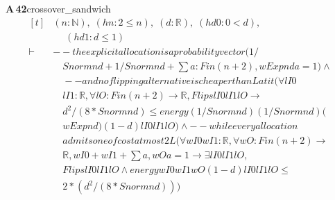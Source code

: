 \documentclass[conference]{IEEEtran}
\theoremstyle{definition}
\newcommand{\lean}[1]{\textsf{\footnotesize #1}}
\begin{document}
\noindent\textbf{A\,42}\quad\lean{crossover\_sandwich}
{\footnotesize\[ \begin{aligned}[t]
&(\mathit{n} : \mathbb{N} ),\; (\mathit{hn} : 2 \leq \mathit{n}),\; (\mathit{d} : \mathbb{R} ),\; (\mathit{hd0} : 0 < \mathit{d}),\\
&\quad \; (\mathit{hd1} : \mathit{d} \leq 1)\\
\vdash\;&-- \mathit{the} \mathit{explicit} \mathit{allocation} \mathit{is} \mathit{a} \mathit{probability} \mathit{vector} (1/\\
&\quad \mathit{Snorm} \mathit{n} \mathit{d} + 1/\mathit{Snorm} \mathit{n} \mathit{d} + \textstyle\sum \mathit{a} : \mathit{Fin} (\mathit{n}+2), \mathit{wExp} \mathit{n} \mathit{d} \mathit{a} = 1) \wedge\\
&\quad -- \mathit{and} \mathit{no} \mathit{flipping} \mathit{alternative} \mathit{is} \mathit{cheaper} \mathit{than} \mathit{L} \mathit{at} \mathit{it} (\forall \mathit{lI0}\\
&\quad \mathit{lI1} : \mathbb{R} , \forall \mathit{lO} : \mathit{Fin} (\mathit{n}+2) \to \mathbb{R} , \mathit{Flips} \mathit{lI0} \mathit{lI1} \mathit{lO} \to\\
&\quad \mathit{d}^{2}/(8*\mathit{Snorm} \mathit{n} \mathit{d}) \leq \mathit{energy} (1/\mathit{Snorm} \mathit{n} \mathit{d}) (1/\mathit{Snorm} \mathit{n} \mathit{d}) (\\
&\quad \mathit{wExp} \mathit{n} \mathit{d}) (1-\mathit{d}) \mathit{lI0} \mathit{lI1} \mathit{lO}) \wedge -- \mathit{while} \mathit{every} \mathit{allocation}\\
&\quad \mathit{admits} \mathit{one} \mathit{of} \mathit{cost} \mathit{at} \mathit{most} 2 \mathit{L} (\forall \mathit{wI0} \mathit{wI1} : \mathbb{R} , \forall \mathit{wO} : \mathit{Fin} (\mathit{n}+2) \to\\
&\quad \mathbb{R} , \mathit{wI0} + \mathit{wI1} + \textstyle\sum \mathit{a}, \mathit{wO} \mathit{a} = 1 \to \exists \mathit{lI0} \mathit{lI1} \mathit{lO},\\
&\quad \mathit{Flips} \mathit{lI0} \mathit{lI1} \mathit{lO} \wedge \mathit{energy} \mathit{wI0} \mathit{wI1} \mathit{wO} (1-\mathit{d}) \mathit{lI0} \mathit{lI1} \mathit{lO} \leq\\
&\quad 2*(\mathit{d}^{2}/(8*\mathit{Snorm} \mathit{n} \mathit{d})))
\end{aligned} \]}
\end{document}
